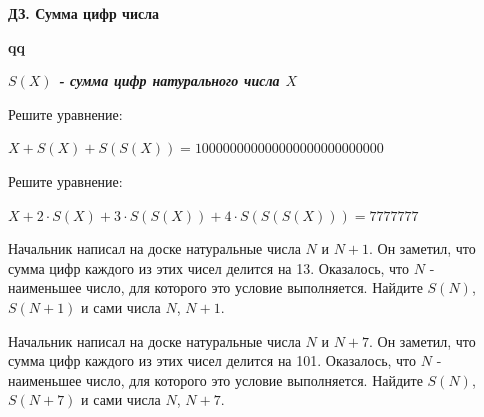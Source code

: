 \centerline{\bf \Huge ДЗ. Сумма цифр числа}
\centerline{\bf \Huge }

\begin{flushright}
        \scriptsize{\textbf{qq}}
\end{flushright}

\textbf{\textit{$S(X)$ - сумма цифр натурального числа $X$}}

 Решите уравнение:

$X + S(X) + S(S(X)) = 100000000000000000000000000$

 Решите уравнение:

$X + 2\cdot S(X) + 3\cdot S(S(X)) + 4 \cdot S(S(S(X)))  = 7777777$

 Начальник написал на доске натуральные числа $N$ и $N+1$. Он заметил, что сумма цифр каждого из этих чисел делится на 13. Оказалось, что $N$ - наименьшее число, для которого это условие выполняется. Найдите $S(N)$, $S(N+1)$ и сами числа $N$, $N+1$.


 Начальник написал на доске натуральные числа $N$ и $N+7$. Он заметил, что сумма цифр каждого из этих чисел делится на 101. Оказалось, что $N$ - наименьшее число, для которого это условие выполняется. Найдите $S(N)$, $S(N+7)$ и сами числа $N$, $N+7$.
